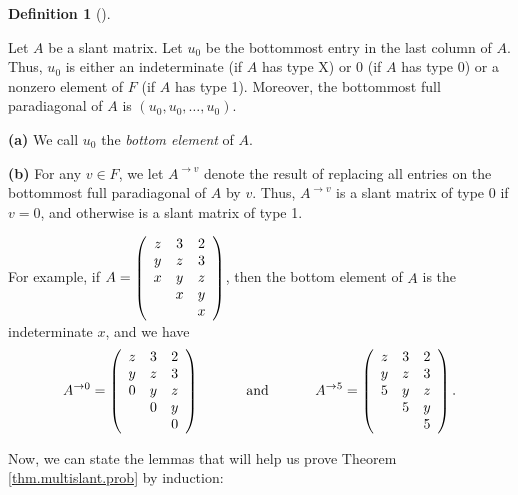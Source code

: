 \documentclass[numbers=enddot,12pt,final,onecolumn,notitlepage]{scrartcl}%
\theoremstyle{definition}
\newtheorem{defi}[theo]{Definition}
\newenvironment{definition}[1][]
{\begin{defi}[#1]\begin{leftbar}}
{\end{leftbar}\end{defi}}
\theoremstyle{plainsl}
\begin{document}
\begin{definition}
Let $A$ be a slant matrix. Let $u_{0}$ be the bottommost entry in the last
column of $A$. Thus, $u_{0}$ is either an indeterminate (if $A$ has type X) or
$0$ (if $A$ has type 0) or a nonzero element of $F$ (if $A$ has type 1).
Moreover, the bottommost full paradiagonal of $A$ is $\left(  u_{0}%
,u_{0},\ldots,u_{0}\right)  $.

\textbf{(a)} We call $u_{0}$ the \emph{bottom element} of $A$.

\textbf{(b)} For any $v\in F$, we let $A^{\rightarrow v}$ denote the result of
replacing all entries on the bottommost full paradiagonal of $A$ by $v$. Thus,
$A^{\rightarrow v}$ is a slant matrix of type 0 if $v=0$, and otherwise is a
slant matrix of type 1.
\end{definition}

For example, if $A=\left(
\begin{array}
[c]{ccc}%
z & 3 & 2\\
y & z & 3\\
x & y & z\\
& x & y\\
&  & x
\end{array}
\right)  $, then the bottom element of $A$ is the indeterminate $x$, and we
have%
\[
A^{\rightarrow0}=\left(
\begin{array}
[c]{ccc}%
z & 3 & 2\\
y & z & 3\\
0 & y & z\\
& 0 & y\\
&  & 0
\end{array}
\right)  \ \ \ \ \ \ \ \ \ \ \text{and}\ \ \ \ \ \ \ \ \ \ A^{\rightarrow
5}=\left(
\begin{array}
[c]{ccc}%
z & 3 & 2\\
y & z & 3\\
5 & y & z\\
& 5 & y\\
&  & 5
\end{array}
\right)  .
\]


Now, we can state the lemmas that will help us prove Theorem
\ref{thm.multislant.prob} by induction:
\end{document}
